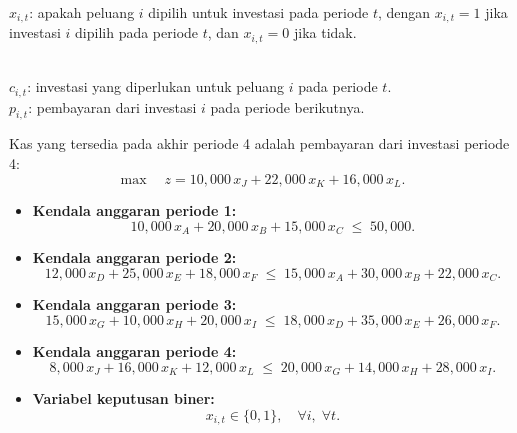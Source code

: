 \begin{solution}

 \\
$x_{i,t}$: apakah peluang $i$ dipilih untuk investasi pada periode $t$, dengan $x_{i,t} = 1$ jika investasi $i$ dipilih pada periode $t$, dan $x_{i,t} = 0$ jika tidak.

 \\
$c_{i,t}$: investasi yang diperlukan untuk peluang $i$ pada periode $t$. \\
$p_{i,t}$: pembayaran dari investasi $i$ pada periode berikutnya.

\smallskip {} Kas yang tersedia pada akhir periode 4 adalah pembayaran dari investasi periode 4:
\[
\max \quad z = 10{,}000\,x_{J} + 22{,}000\,x_{K} + 16{,}000\,x_{L}.
\]

\smallskip {}
\begin{itemize}
\item \textbf{Kendala anggaran periode 1:}
\[
10{,}000\,x_A + 20{,}000\,x_B + 15{,}000\,x_C \;\leq\; 50{,}000.
\]
\item \textbf{Kendala anggaran periode 2:}
\[
12{,}000\,x_D + 25{,}000\,x_E + 18{,}000\,x_F \;\leq\; 15{,}000\,x_A + 30{,}000\,x_B + 22{,}000\,x_C.
\]
\item \textbf{Kendala anggaran periode 3:}
\[
15{,}000\,x_G + 10{,}000\,x_H + 20{,}000\,x_I \;\leq\; 18{,}000\,x_D + 35{,}000\,x_E + 26{,}000\,x_F.
\]
\item \textbf{Kendala anggaran periode 4:}
\[
8{,}000\,x_J + 16{,}000\,x_K + 12{,}000\,x_L \;\leq\; 20{,}000\,x_G + 14{,}000\,x_H + 28{,}000\,x_I.
\]
\item \textbf{Variabel keputusan biner:}
\[
x_{i,t} \in \{0,1\}, \quad \forall i,\; \forall t.
\]
\end{itemize}


\end{solution}

